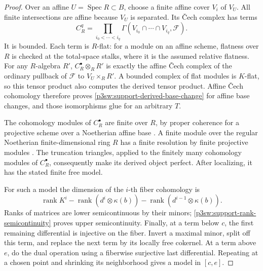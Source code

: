 \documentclass[11pt]{article}
\numberwithin{equation}{section}
\begin{document}
\begin{proof}
Over an affine \(U=\operatorname{Spec}R\subset B\), choose a finite
affine cover \(V_i\) of \(V_U\).  All finite intersections are affine
because \(V_U\) is separated.  Its \v{C}ech complex has terms
\begin{equation}
 C_R^q=\prod_{i_0<\cdots<i_q}
       \Gamma(V_{i_0}\cap\cdots\cap V_{i_q},\mathcal F).
 \label{p3sw:support-cech}
\end{equation}
It is bounded.  Each term is \(R\)-flat: for a module on an affine
scheme, flatness over \(R\) is checked at the total-space stalks, where
it is the assumed relative flatness.  For any \(R\)-algebra \(R'\),
\(C_R^\bullet\otimes_RR'\) is exactly the affine \v{C}ech complex of the
ordinary pullback of \(\mathcal F\) to \(V_U\times_RR'\).
A bounded complex of flat modules is \(K\)-flat, so this tensor product
also computes the derived tensor product.  Affine \v{C}ech cohomology
therefore proves \eqref{p3sw:support-derived-base-change} for affine base changes, and those isomorphisms
glue for an arbitrary \(T\).

The cohomology modules of \(C_R^\bullet\) are finite over \(R\), by
proper coherence for a projective scheme over a Noetherian affine base
\cite[Lemma 30.16.1(3), Tag 0B5T]{P3SWStacks}.  A finite module over
the regular Noetherian finite-dimensional ring \(R\) has a finite
resolution by finite projective modules
\cite[Section 10.110, Tag 065U]{P3SWStacks}.
The truncation triangles, applied to the finitely many cohomology
modules of \(C_R^\bullet\), consequently make its derived object
perfect.  After localizing, it has the stated finite free model.

For such a model the dimension of the \(i\)-th fiber cohomology is
\begin{equation}
 \operatorname{rank}K^i-
 \operatorname{rank}(d^i\otimes\kappa(b))-
 \operatorname{rank}(d^{i-1}\otimes\kappa(b)).
 \label{p3sw:support-rank-semicontinuity}
\end{equation}
Ranks of matrices are lower semicontinuous by their minors; \eqref{p3sw:support-rank-semicontinuity}
proves upper semicontinuity.  Finally, at a term below \(c\), the first
remaining differential is injective on the fiber.  Invert a maximal
minor, split off this term, and replace the next term by its locally
free cokernel.  At a term above \(e\), do the dual operation using a
fiberwise surjective last differential.  Repeating at a chosen point
and shrinking its neighborhood gives a model in \([c,e]\).
\end{proof}
\end{document}
